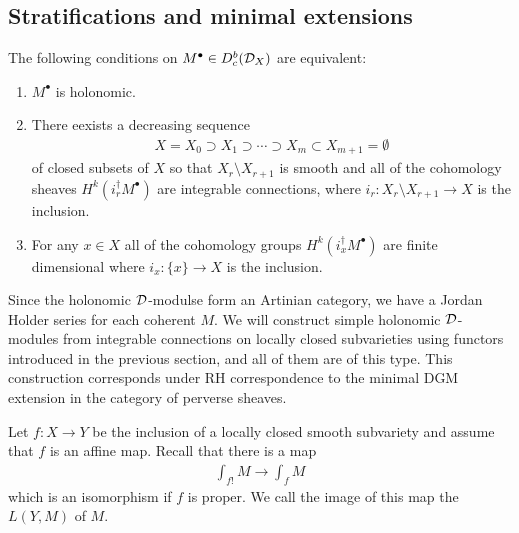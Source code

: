 \subsection{Stratifications and minimal extensions}
\begin{theorem}
	The following conditions on $M^\bullet \in D^b_c({\mathcal{D}}_X)$ are equivalent:
	\begin{enumerate}
		\item $M^\bullet$ is holonomic.
		\item There eexists a decreasing sequence \begin{align*}
			      X = X_0 \supset X_1 \supset \cdots \supset X_m \subset X_{m+1} = \emptyset
		      \end{align*} of closed subsets of $X$ so that $X_r\setminus X_{r+1}$ is smooth and
		      all of the cohomology sheaves $H^k(i_r^\dagger M^\bullet)$ are integrable connections,
		      where $i_r:X_r\setminus X_{r+1}\to X$ is the inclusion.
		\item For any $x\in X$ all of the cohomology groups $H^k(i_x^\dagger M^\bullet)$ are finite dimensional where
		      $i_x:\{x\}\to X$ is the inclusion.
	\end{enumerate}
\end{theorem}
Since
the holonomic ${\mathcal{D}}$-modulse form an Artinian category, we have a Jordan Holder series for each coherent $M$.
We will construct simple holonomic ${\mathcal{D}}$-modules from integrable connections on locally
closed subvarieties using functors introduced in the previous section, and all of them are of this type.
This construction corresponds under RH correspondence to the minimal DGM extension
in the category of perverse sheaves.

\begin{definition}
	Let $f:X\to Y$ be the inclusion of a locally closed smooth subvariety
	and assume that $f$ is an affine map. Recall that there is a map
	\begin{align*}
		\int_{f!}M \to \int_f M
	\end{align*} which is an isomorphism if $f$ is proper.
	We call the image of this map the  $L(Y,M)$ of $M$.
\end{definition}

